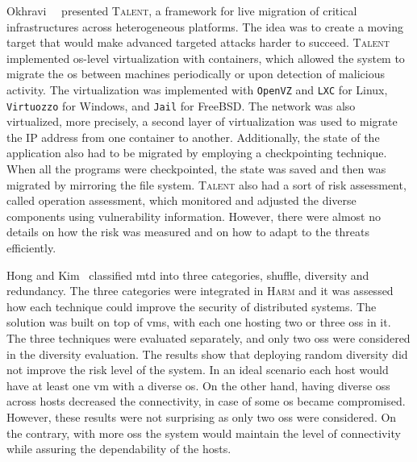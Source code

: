 Okhravi~\etal{}~\cite{Okhravi:2014} presented \textsc{Talent}, a framework for live migration of critical infrastructures across heterogeneous platforms.
The idea was to create a moving target that would make advanced targeted attacks harder to succeed. 
\textsc{Talent} implemented \gls{os}-level virtualization with containers, which allowed the system to migrate the \gls{os} between machines periodically or upon detection of malicious activity. 
The virtualization was implemented with \texttt{OpenVZ} and \texttt{LXC} for Linux, \texttt{Virtuozzo} for Windows, and \texttt{Jail} for FreeBSD. 
The network was also virtualized, more precisely, a second layer of virtualization was used to migrate the IP address from one container to another. 
Additionally, the state of the application also had to be migrated by employing a checkpointing technique. 
When all the programs were checkpointed, the state was saved and then was migrated by mirroring the file system. 
\textsc{Talent} also had a sort of risk assessment, called operation assessment, which monitored and adjusted the diverse components using vulnerability information. 
However, there were almost no details on how the risk was measured and on how to adapt to the threats efficiently.


Hong and Kim~\cite{Hong:2015} classified \gls{mtd} into three categories, shuffle, diversity and redundancy.
The three categories were integrated in \textsc{Harm} and it was assessed how each technique could improve the security of distributed systems.
The solution was built on top of \glspl{vm}, with each one hosting two or three \glspl{os} in it.
The three techniques were evaluated separately, and only two \glspl{os} were considered in the diversity evaluation.
The results show that deploying random diversity did not improve the risk level of the system. 
In an ideal scenario each host would have at least one \gls{vm} with a diverse \gls{os}.
On the other hand, having diverse \glspl{os} across hosts decreased the connectivity, in case of some \gls{os} became compromised.
However, these results were not surprising as only two \glspl{os} were considered.
On the contrary, with more \glspl{os} the system would maintain the level of connectivity while assuring the dependability of the hosts.
 

